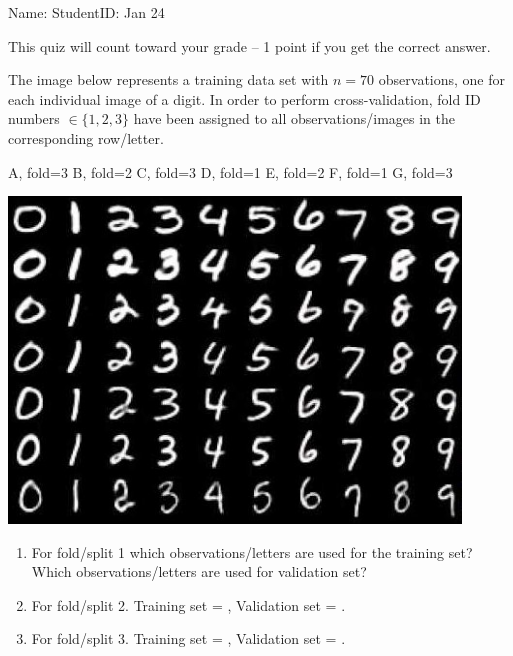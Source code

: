 \documentclass{article}[12pt]
\begin{document}
\thispagestyle{empty}


Name: \underline{\hspace{2in}} StudentID: \underline{\hspace{2in}} Jan 24

This quiz will count toward your grade -- 1 point if you get the
correct answer.

The image below represents a training data set with $n=70$
observations, one for each individual image of a digit. In order to
perform cross-validation, fold ID numbers $\in\{1,2,3\}$ have been
assigned to all observations/images in the corresponding row/letter.


\newcommand{\myskip}{\vskip 0.8cm}
\parbox{0.1\textwidth}{
A, fold=3
\myskip
B, fold=2
\myskip
C, fold=3
\myskip
D, fold=1
\myskip
E, fold=2
\myskip
F, fold=1
\myskip
G, fold=3
}
\parbox{0.9\textwidth}{
  \includegraphics[width=0.9\textwidth]{mnist-digits}
}

\begin{enumerate}
\vskip 1cm
\item For fold/split 1 which observations/letters are used for the
  training set?  \underline{\hspace{1.5in}} Which observations/letters
  are used for validation set? \underline{\hspace{1.5in}}

\vskip 1cm
\item For fold/split 2. Training set = \underline{\hspace{1.5in}},
  Validation set = \underline{\hspace{1.5in}}.

\vskip 1cm
\item For fold/split 3. Training set = \underline{\hspace{1.5in}},
  Validation set = \underline{\hspace{1.5in}}.
\end{enumerate}
\end{document}
